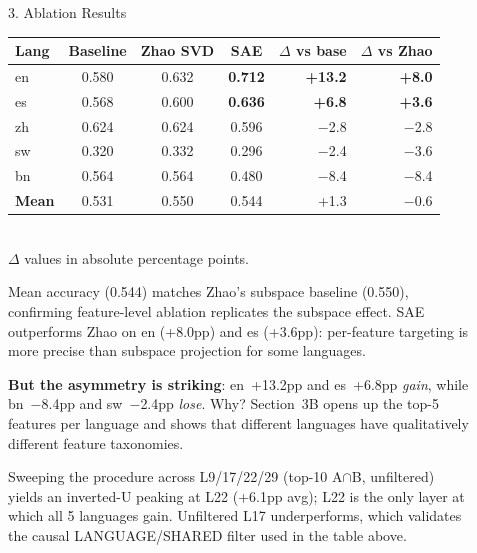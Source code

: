 \documentclass[final]{beamer}
\newlength{\sepwidth}
\newlength{\colwidth}
\newcommand{\separatorcolumn}{\begin{column}{\sepwidth}\end{column}}
\begin{document}
\begin{frame}[t]
\begin{columns}[t]
\begin{column}{\colwidth}
\begin{block}{3. Ablation Results}
\begin{center}
    \renewcommand{\arraystretch}{1.05}
    \begin{tabular}{l c c c r r}
    \toprule
    \textbf{Lang} & \textbf{Baseline} & \textbf{Zhao SVD}
      & \textbf{SAE} & \textbf{$\Delta$ vs base} & \textbf{$\Delta$ vs Zhao} \\
    \midrule
    en   & 0.580 & 0.632 & \textbf{0.712} & \textbf{+13.2} & \textbf{+8.0} \\
    es   & 0.568 & 0.600 & \textbf{0.636} & \textbf{+6.8}  & \textbf{+3.6} \\
    zh   & 0.624 & 0.624 & 0.596          & $-$2.8         & $-$2.8 \\
    sw   & 0.320 & 0.332 & 0.296          & $-$2.4         & $-$3.6 \\
    bn   & 0.564 & 0.564 & 0.480          & $-$8.4         & $-$8.4 \\
    \midrule
    \textbf{Mean} & 0.531 & 0.550 & 0.544 & +1.3 & $-$0.6 \\
    \bottomrule
    \end{tabular}
    \\[0.3em]
    {\footnotesize $\Delta$ values in absolute percentage points.}
    \end{center}

    Mean accuracy (0.544) matches Zhao's subspace baseline (0.550),
    confirming feature-level ablation replicates the subspace effect.
    SAE outperforms Zhao on en (+8.0pp) and es (+3.6pp): per-feature
    targeting is more precise than subspace projection for some languages.

    \textbf{But the asymmetry is striking}: en~+13.2pp and es~+6.8pp
    \emph{gain}, while bn~$-$8.4pp and sw~$-$2.4pp \emph{lose}. Why?
    Section~3B opens up the top-5 features per language and shows that
    different languages have qualitatively different feature taxonomies.

    Sweeping the procedure across L9/17/22/29 (top-10 A$\cap$B,
    unfiltered) yields an inverted-U peaking at L22 (+6.1pp avg);
    L22 is the only layer at which all 5 languages gain. Unfiltered
    L17 underperforms, which validates the causal LANGUAGE/SHARED
    filter used in the table above.

  \end{block}

\end{column}

\separatorcolumn

\begin{column}{\colwidth}


\end{column}
\end{columns}
\end{frame}
\end{document}
